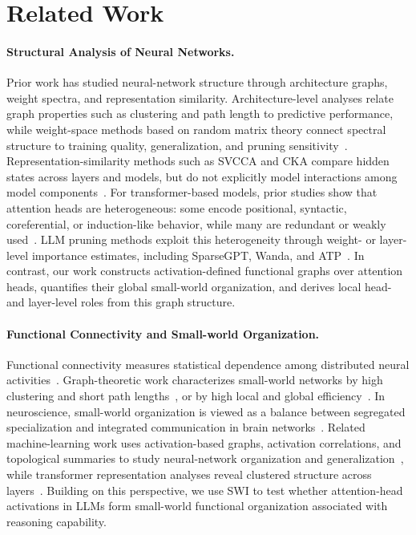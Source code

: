
\vspace{-0.3cm}
\section{Related Work}
\vspace{-0.3cm}

\paragraph{Structural Analysis of Neural Networks.}
Prior work has studied neural-network structure through architecture graphs, weight spectra, and representation similarity. Architecture-level analyses relate graph properties such as clustering and path length to predictive performance, while weight-space methods based on random matrix theory connect spectral structure to training quality, generalization, and pruning sensitivity~\cite{you2020graph, martin2021implicit}. Representation-similarity methods such as SVCCA and CKA compare hidden states across layers and models, but do not explicitly model interactions among model components~\cite{raghu2017svcca, kornblith2019similarity, liu2025spectral}. For transformer-based models, prior studies show that attention heads are heterogeneous: some encode positional, syntactic, coreferential, or induction-like behavior, while many are redundant or weakly used~\cite{clark2019does, voita2019analyzing, michel2019sixteen}. LLM pruning methods exploit this heterogeneity through weight- or layer-level importance estimates, including SparseGPT, Wanda, and ATP~\cite{frantar2023sparsegpt, sun2023simple, huang2025determining}. In contrast, our work constructs activation-defined functional graphs over attention heads, quantifies their global small-world organization, and derives local head- and layer-level roles from this graph structure.

\paragraph{Functional Connectivity and Small-world Organization.}
Functional connectivity measures statistical dependence among distributed neural activities~\cite{friston1994functional}. Graph-theoretic work characterizes small-world networks by high clustering and short path lengths~\cite{watts1998collective}, or by high local and global efficiency~\cite{latora2001efficient}. In neuroscience, small-world organization is viewed as a balance between segregated specialization and integrated communication in brain networks~\cite{bassett2006small, bullmore2009complex}. Related machine-learning work uses activation-based graphs, activation correlations, and topological summaries to study neural-network organization and generalization~\cite{horta2021extracting, ballester2024predicting, ballester2023topological}, while transformer representation analyses reveal clustered structure across layers~\cite{phang2021fine}. Building on this perspective, we use SWI to test whether attention-head activations in LLMs form small-world functional organization associated with reasoning capability.